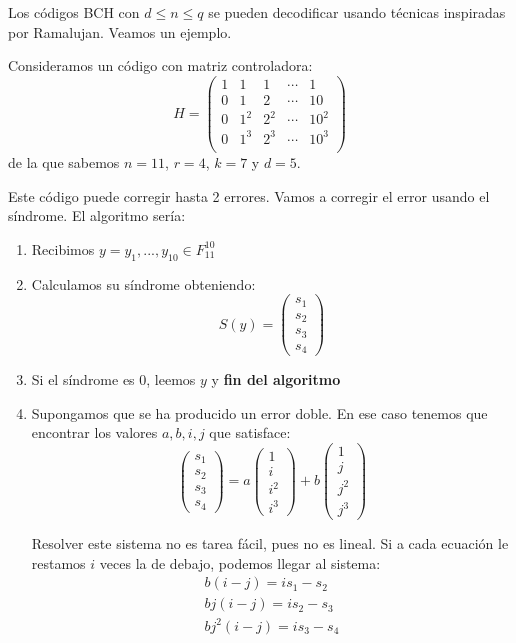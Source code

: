 Los códigos BCH con $d \leq n \leq q$ se pueden decodificar usando técnicas inspiradas por Ramalujan. Veamos un ejemplo.

\begin{example}
Consideramos un código con matriz controladora:
\[H=\left( \begin{array}{ccccc}
1& 1 & 1 & \cdots & 1 \\
0 & 1 & 2 & \cdots & 10 \\
0 & 1^2 & 2^2 & \cdots & 10^2 \\
0 & 1^3 & 2^3 & \cdots & 10^3 \\
\end{array}\right)\]
de la que sabemos $n=11$, $r=4$, $k=7$ y $d=5$.

Este código puede corregir hasta 2 errores. Vamos a corregir el error usando el síndrome. El algoritmo sería:

\begin{enumerate}
\item Recibimos $y=y_1,...,y_{10} \in F_{11}^{10}$
\item Calculamos su síndrome obteniendo:
\[S(y) = \left( \begin{array}{c} s_1 \\ s_2 \\ s_3 \\ s_4\end{array}\right)\]
\item Si el síndrome es $0$, leemos $y$ y \textbf{fin del algoritmo}
\item Supongamos que se ha producido un error doble. En ese caso tenemos que encontrar los valores $a,b,i,j$ que satisface:
\[\left( \begin{array}{c} s_1 \\ s_2 \\ s_3 \\ s_4\end{array}\right) = a\left( \begin{array}{c} 1 \\ i \\ i^2 \\ i^3\end{array}\right) + b\left( \begin{array}{c} 1 \\ j \\ j^2 \\ j^3\end{array}\right)\]

Resolver este sistema no es tarea fácil, pues no es lineal. Si a cada ecuación le restamos $i$ veces la de debajo, podemos llegar al sistema:
\[\begin{array}{l}
b(i-j) = is_1-s_2\\
bj(i-j)=is_2-s_3\\
bj^2(i-j)=is_3-s_4
\end{array}\]


\end{enumerate}
\end{example}
